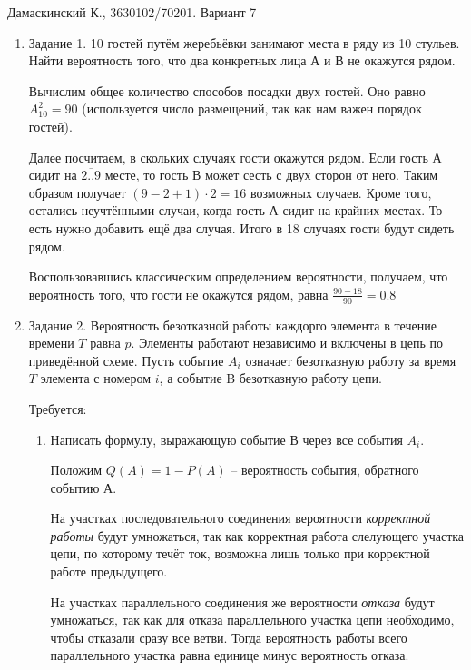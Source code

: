 


\begin{flushright}\large Дамаскинский К., 3630102/70201. Вариант 7\end{flushright}

\begin{enumerate}
\item{Задание 1.}
10 гостей путём жеребьёвки занимают места в ряду из 10 стульев. Найти вероятность того, что два конкретных лица А и В не окажутся рядом.

Вычислим общее количество способов посадки двух гостей. Оно равно $ A_{10}^2 = 90 $ (используется число размещений, так как нам важен порядок
гостей).

Далее посчитаем, в скольких случаях гости окажутся рядом. Если гость А сидит на $\overline{2..9}$ месте, то гость В может сесть с двух сторон от него. Таким образом получает $(9 - 2 + 1) \cdot 2 = 16$ возможных случаев. Кроме того, остались неучтёнными случаи, когда гость А сидит на крайних местах. То есть нужно добавить ещё два случая. Итого в 18 случаях гости будут сидеть рядом.

Воспользовавшись классическим определением вероятности, получаем, что вероятность того, что гости не окажутся рядом, равна $\frac{90-18}{90}=0.8$

\item{Задание 2}. Вероятность безотказной работы каждорго элемента в течение времени $T$ равна $p$. Элементы работают независимо и включены в цепь по приведённой схеме. Пусть событие $A_i$ означает безотказную работу за время $T$ элемента с номером $i$, а событие B безотказную работу цепи.

Требуется:
\begin{enumerate}
\item{} Написать формулу, выражающую событие В через все события $A_i$.

Положим $Q(A) = 1 - P(A)$ -- вероятность события, обратного событию А.

На участках последовательного соединения вероятности \textit{корректной работы} будут умножаться, так как корректная работа слелующего участка цепи, по которому течёт ток, возможна лишь только при корректной работе предыдущего.

На участках параллельного соединения же вероятности \textit{отказа} будут умножаться, так как для отказа параллельного участка цепи необходимо, чтобы отказали сразу все ветви. Тогда вероятность работы всего параллельного участка равна единице минус вероятность отказа.


\end{enumerate}
\end{enumerate}
